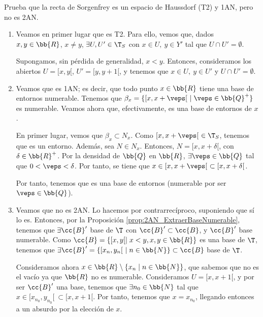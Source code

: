 \begin{ejercicio}
    Prueba que la recta de Sorgenfrey es un espacio de Haussdorf (T2) y 1AN, pero no es 2AN.

    \begin{enumerate}
        \item Veamos en primer lugar que es T2. Para ello, vemos que, dados $x,y\in \bb{R}$, $x\neq y$, $\exists U,U'\in \T_S$ con $x\in U,~ y\in Y'$ tal que $U\cap U'=\emptyset$.
    
        Supongamos, sin pérdida de generalidad, $x<y$. Entonces, consideramos los abiertos $U=[x,y[$, $U'=[y,y+1[$, y tenemos que $x\in U,~y\in U'$ y $U\cap U'=\emptyset$.
    
        \item Veamos que es 1AN; es decir, que todo punto $x\in \bb{R}$ tiene una base de entornos numerable. Tenemos que $\beta_x=\{[x, x+\veps[~ \mid \veps\in \bb{Q}^+\}$ es numerable. Veamos ahora que, efectivamente, es una base de entornos de $x$.

        En primer lugar, vemos que $\beta_x\subset N_x$. Como $[x,x+\veps[~ \in\T_S$, tenemos que es un entorno. Además, sea $N\in N_x$. Entonces, $N=[x,x+\delta[$, con $\delta\in \bb{R}^+$. Por la densidad de $\bb{Q}$ en $\bb{R}$, $\exists \veps\in \bb{Q}$ tal que $0<\veps<\delta$. Por tanto, se tiene que $x\in [x,x+\veps[~ \subset [x,x+\delta[$.
        
        Por tanto, tenemos que es una base de entornos (numerable por ser $\veps\in\bb{Q}$).

        \item Veamos que no es 2AN. Lo hacemos por contrarrecíproco, suponiendo que sí lo es. Entonces, por la Proposición \ref{prop:2AN_ExtraerBaseNumerable}, tenemos que $\exists \cc{B}'$ base de $\T$ con $\cc{B}'\subset \cc{B}$, y $\cc{B}'$ base numerable. Como $\cc{B}=\{[x,y[\mid x<y, x,y\in \bb{R}\}$ es una base de $\T$, tenemos que $\exists \cc{B}'=\{[x_n,y_n[~ \mid n\in \bb{N}\}\subset \cc{B}$ base de $\T$. 
        
        Consideramos ahora $x\in \bb{R}\setminus \{x_n\mid n\in \bb{N}\}$, que sabemos que no es el vacío ya que $\bb{R}$ no es numerable. Consideramos $U=[x,x+1[$, y por ser $\cc{B}'$ una base, tenemos que $\exists n_0\in \bb{N}$ tal que $x\in [x_{n_0},y_{n_0}[~ \subset [x,x+1[$. Por tanto, tenemos que $x=x_{n_0}$, llegando entonces a un absurdo por la elección de $x$.
    \end{enumerate}
\end{ejercicio}

